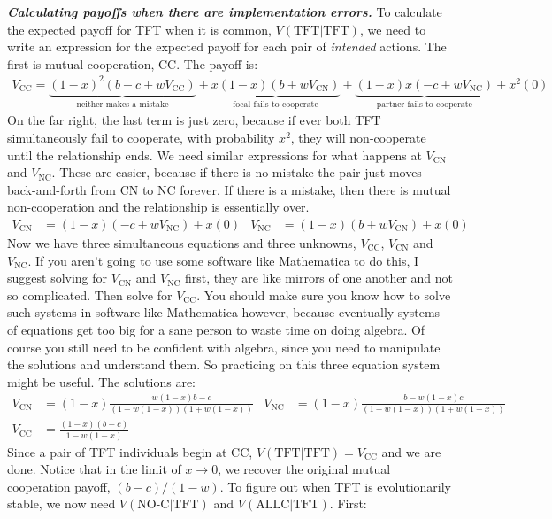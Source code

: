 \documentclass[10pt,reqno]{amsbook}
\numberwithin{equation}{chapter}
\newenvironment{mathbox}[2]
{\begin{table}[#1]
\justify\begin{tcolorbox}[enhanced, oversize]\footnotesize\noindent\textbf{\emph{#2}}}
{\end{tcolorbox}\end{table}}
\begin{document}
\begin{mathbox}{p}{Calculating payoffs when there are implementation errors.} 
To calculate the expected payoff for TFT when it is common, $V(\text{TFT}|\text{TFT})$, we need to write an expression for the expected payoff for each pair of \emph{intended} actions. The first is mutual cooperation, CC. The payoff is:
\begin{align*}
	V_\text{CC} = \underbrace{(1-x)^2 (b-c+wV_\text{CC})}_\text{neither makes a mistake} 
	+ \underbrace{x(1-x)(b + wV_\text{CN})}_\text{focal fails to cooperate}
	+ \underbrace{(1-x)x(-c + wV_\text{NC})}_\text{partner fails to cooperate}
	+ x^2(0)
\end{align*}
On the far right, the last term is just zero, because if ever both TFT simultaneously fail to cooperate, with probability $x^2$, they will non-cooperate until the relationship ends. We need similar expressions for what happens at $V_\text{CN}$ and $V_\text{NC}$. These are easier, because if there is no mistake the pair just moves back-and-forth from CN to NC forever. If there is a mistake, then there is mutual non-cooperation and the relationship is essentially over.
\begin{align*}
	V_\text{CN} &= (1-x)(-c + wV_\text{NC}) + x(0)  & 
	V_\text{NC} &= (1-x)(b + wV_\text{CN}) + x(0)
\end{align*}
Now we have three simultaneous equations and three unknowns, $V_\text{CC}$, $V_\text{CN}$ and $V_\text{NC}$. If you aren't going to use some software like Mathematica to do this, I suggest solving for $V_\text{CN}$ and $V_\text{NC}$ first, they are like mirrors of one another and not so complicated. Then solve for $V_\text{CC}$. You should make sure you know how to solve such systems in software like Mathematica however, because eventually systems of equations get too big for a sane person to waste time on doing algebra. Of course you still need to be confident with algebra, since you need to manipulate the solutions and understand them. So practicing on this three equation system might be useful. The solutions are:
\begin{align*}
	V_\text{CN} &= (1-x)\frac{w(1-x)b-c}{(1-w(1-x))(1+w(1-x))}  & 
	V_\text{NC} &= (1-x)\frac{b-w(1-x)c}{(1-w(1-x))(1+w(1-x))} \\
	V_\text{CC} &= \frac{(1-x)(b-c)}{1-w(1-x)} 
\end{align*}
Since a pair of TFT individuals begin at CC, $V(\text{TFT}|\text{TFT}) = V_\text{CC}$ and we are done. Notice that in the limit of $x \rightarrow 0$, we recover the original mutual cooperation payoff, $(b-c)/(1-w)$. To figure out when TFT is evolutionarily stable, we now need $V(\text{NO-C}|\text{TFT})$ and $V(\text{ALLC}|\text{TFT})$. First:

\end{mathbox}
\end{document}
